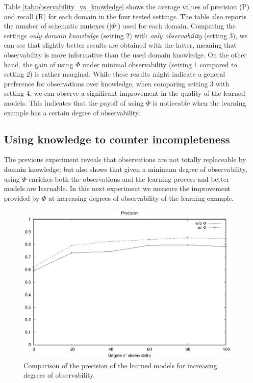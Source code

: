 \documentclass{article}
\begin{document}
Table \ref{tab:observability_vs_knowledge} shows the average values of precision (P) and recall (R) for each domain in the four tested settings. The table also reports the number of schematic mutexes ($|\Phi|$) used for each domain. Comparing the settings \emph{only domain knowledge} (setting 2) with \emph{only observability} (setting 3), we can see that slightly better results are obtained with the latter, meaning that observability is more informative than the used domain knowledge. On the other hand, the gain of using $\Phi$ under minimal observability (setting 1 compared to setting 2) is rather marginal. While these results might indicate a general preference for observations over knowledge, when comparing setting 3 with setting 4, we can observe a significant improvement in the quality of the learned models. This indicates that the payoff of using $\Phi$ is noticeable when the learning example has a certain degree of observability.


\subsection{Using knowledge to counter incompleteness}

The previous experiment reveals that observations are not totally replaceable by domain knowledge; but also shows that given a minimum degree of observability, using $\Phi$ enriches both the observations and the learning process and better models are learnable. In this next experiment we measure the improvement provided by $\Phi$ at increasing degrees of observability of the learning example.

\begin{figure}[hbt!]
	\centering
	\includegraphics[width=\linewidth]{figures/comparison_precision.eps}
	\caption{Comparison of the precision of the learned models for increasing degrees of observability.}
	\label{fig:comparison_precision}
\end{figure}
\end{document}

